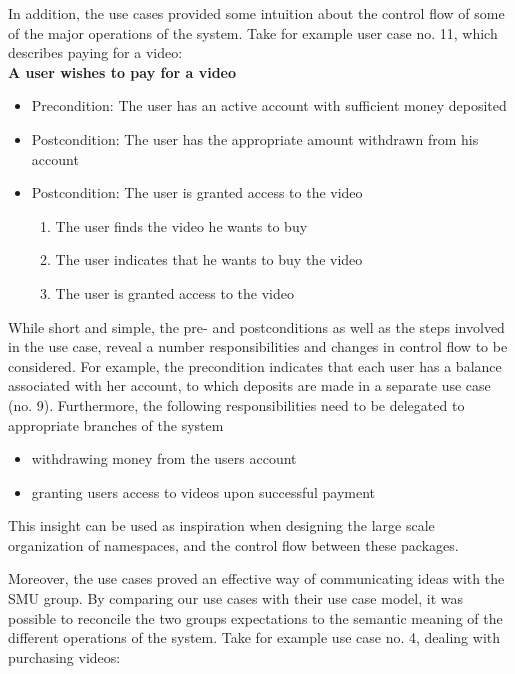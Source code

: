 In addition, the use cases provided some intuition about the control flow of some of the major operations of the system. Take for example user case no. 11, which describes paying for a video:\\

\textbf{A user wishes to pay for a video}
\begin{itemize}
	\item Precondition: The user has an active account with sufficient money deposited
	\item Postcondition: The user has the appropriate amount withdrawn from his 				account
	\item Postcondition: The user is granted access to the video
	\begin{enumerate}
		\item The user finds the video he wants to buy
		\item The user indicates that he wants to buy the video
		\item The user is granted access to the video
	\end{enumerate}
\end{itemize}

While short and simple, the pre- and postconditions as well as the steps involved in the use case, reveal a number responsibilities and changes in control flow to be considered. For example, the precondition indicates that each user has a balance associated with her account, to which deposits are made  in a separate use case (no. 9). Furthermore, the following responsibilities need to be delegated to appropriate branches of the system
\begin{itemize}
\item withdrawing money from the users account
\item granting users access to videos upon successful payment
\end{itemize}
This insight can be used as inspiration when designing the large scale organization of namespaces, and the control flow between these packages.

Moreover, the use cases proved an effective way of communicating ideas with the SMU group. By comparing our use cases with their use case model, it was possible to reconcile the two groups expectations to the semantic meaning of the different operations of the system. Take for example use case no. 4, dealing with purchasing videos:\\

